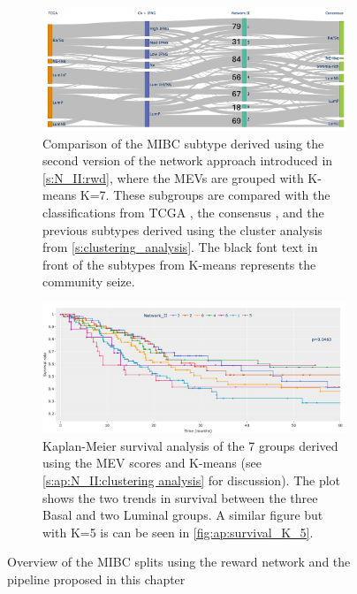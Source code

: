 \begin{figure}[!htb]
    \centering
    \begin{subfigure}[!t]{1.0\textwidth}
        \includegraphics[width=1.0\textwidth,height=1.0\textheight,keepaspectratio]{Sections/Network_II/resources/reward/cluster_comp_final.png}
        \caption{Comparison of the MIBC subtype derived using the second version of the network approach introduced in \cref{s:N_II:rwd}, where the MEVs are grouped with K-means K=7. These subgroups are compared with the classifications from TCGA \citep{Robertson2017-mg}, the consensus \citep{Kamoun2020-tj}, and the previous subtypes derived using the cluster analysis from \cref{s:clustering_analysis}. The black font text in front of the subtypes from K-means represents the community seize.}
        \label{fig:N_II:mibc_comp}
    \end{subfigure}
    \begin{subfigure}[!t]{1.0\textwidth}
        \includegraphics[width=1.0\textwidth,height=1.0\textheight,keepaspectratio]{Sections/Network_II/resources/reward/cluster_analysis/survival_K_7.png}
        \caption[Overview of the MIBC subgroups derived from the non-tumour reward network]{Kaplan-Meier survival analysis of the 7 groups derived using the MEV scores and K-means (see \ref{s:ap:N_II:clustering analysis} for discussion). The plot shows the two trends in survival between the three Basal and two Luminal groups. A similar figure but with K=5 is can be seen in \cref{fig:ap:survival_K_5}. }
        \label{fig:N_II:survival_K_7}
    \end{subfigure} 
    \caption[Refined rewad network: MIBC overview]{Overview of the MIBC splits using the reward network and the pipeline proposed in this chapter}
\end{figure}


